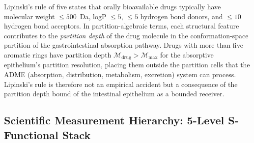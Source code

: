 \begin{remark}
\label{rem:ch02-lipinski}
Lipinski's rule of five states that orally bioavailable drugs typically have
molecular weight $\leq 500$~Da, logP $\leq 5$, $\leq 5$ hydrogen bond donors,
and $\leq 10$ hydrogen bond acceptors.  In partition-algebraic terms, each
structural feature contributes to the \emph{partition depth} of the drug molecule
in the conformation-space partition of the gastrointestinal absorption pathway.
Drugs with more than five aromatic rings have partition depth
$\mathcal{M}_{\mathrm{drug}} > \mathcal{M}_{\mathrm{max}}$ for the absorptive
epithelium's partition resolution, placing them outside the partition cells that
the ADME (absorption, distribution, metabolism, excretion) system can process.
Lipinski's rule is therefore not an empirical accident but a consequence of the
partition depth bound of the intestinal epithelium as a bounded receiver.
\end{remark}

\subsection{Scientific Measurement Hierarchy: 5-Level S-Functional Stack}

